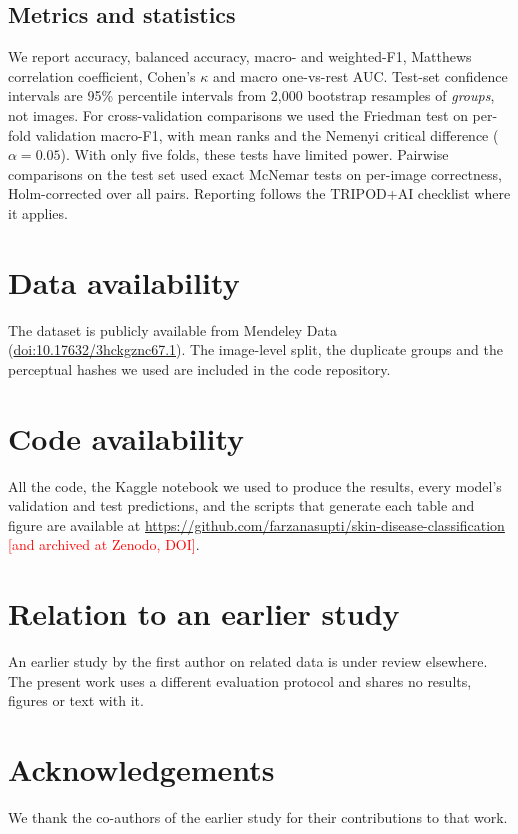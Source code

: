 \documentclass[11pt]{article}
\newcommand{\tbd}[1]{\textcolor{red}{[#1]}}
\begin{document}
\subsection*{Metrics and statistics}
We report accuracy, balanced accuracy, macro- and weighted-F1, Matthews correlation coefficient\cite{chicco2020mcc}, Cohen's $\kappa$ and macro one-vs-rest AUC. Test-set confidence intervals are 95\% percentile intervals from 2{,}000 bootstrap resamples of \emph{groups}, not images\cite{efron1993}. For cross-validation comparisons we used the Friedman test on per-fold validation macro-F1, with mean ranks and the Nemenyi critical difference ($\alpha=0.05$)\cite{demsar2006}. With only five folds, these tests have limited power. Pairwise comparisons on the test set used exact McNemar tests on per-image correctness\cite{dietterich1998}, Holm-corrected over all pairs\cite{holm1979}. Reporting follows the TRIPOD+AI checklist where it applies\cite{collins2024tripod}.

\section*{Data availability}
The dataset is publicly available from Mendeley Data (\href{https://doi.org/10.17632/3hckgznc67.1}{doi:10.17632/3hckgznc67.1}). The image-level split, the duplicate groups and the perceptual hashes we used are included in the code repository.

\section*{Code availability}
All the code, the Kaggle notebook we used to produce the results, every model's validation and test predictions, and the scripts that generate each table and figure are available at \url{https://github.com/farzanasupti/skin-disease-classification} \tbd{and archived at Zenodo, DOI}.

\section*{Relation to an earlier study}
An earlier study by the first author on related data is under review elsewhere. The present work uses a different evaluation protocol and shares no results, figures or text with it.

\section*{Acknowledgements}
We thank the co-authors of the earlier study for their contributions to that work.
\end{document}
